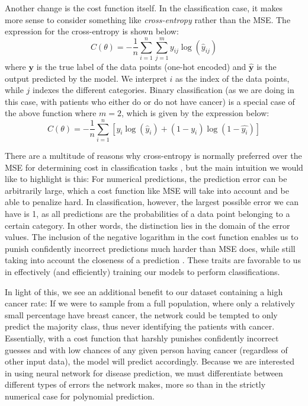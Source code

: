Another change is the cost function itself. In the classification case, it makes more sense to consider something like \emph{cross-entropy} rather than the MSE. The expression for the cross-entropy is shown below:
\[ C(\theta) = -\frac{1}{n}\sum_{i=1}^n \sum_{j=1}^m y_{ij} \log(\hat{y}_{ij}) \]
where $\boldsymbol y$ is the true label of the data points (one-hot encoded) and $\boldsymbol{\hat{y}}$ is the output predicted by the model. We interpret $i$ as the index of the data points, while $j$ indexes the different categories. Binary classification (as we are doing in this case, with patients who either do or do not have cancer) is a special case of the above function where $m = 2$, which is given by the expression below:
\[ C(\theta) = -\frac{1}{n}\sum_{i=1}^n [y_i \log(\hat{y}_i) + (1 - y_i)\log(1-\hat{y_i})] \]

There are a multitude of reasons why cross-entropy is normally preferred over the MSE for determining cost in classification tasks \cite{crossentropyYouTube}, but the main intuition we would like to highlight is this: For numerical predictions, the prediction error can be arbitrarily large, which a cost function like MSE will take into account and be able to penalize hard. In classification, however, the largest possible error we can have is 1, as all predictions are the probabilities of a data point belonging to a certain category. In other words, the distinction lies in the domain of the error values. The inclusion of the negative logarithm in the cost function enables us to punish confidently incorrect predictions much harder than MSE does, while still taking into account the closeness of a prediction \cite{crossentropyExample}. These traits are favorable to us in effectively (and efficiently) training our models to perform classifications.

In light of this, we see an additional benefit to our dataset containing a high cancer rate: If we were to sample from a full population, where only a relatively small percentage have breast cancer, the network could be tempted to only predict the majority class, thus never identifying the patients with cancer. Essentially, with a cost function that harshly punishes confidently incorrect guesses and with low chances of any given person having cancer (regardless of other input data), the model will predict accordingly. Because we are interested in using neural network for disease prediction, we must differentiate between different types of errors the network makes, more so than in the strictly numerical case for polynomial prediction.

